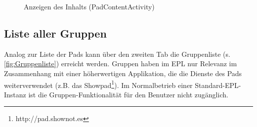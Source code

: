 \begin{figure}[h!]
    \centering
    \setlength\fboxsep{0pt}
	  \caption{Anzeigen des Inhalts (PadContentActivity)}
	  \label{fig:text}
\end{figure}

\subsection{Liste aller Gruppen}
Analog zur Liste der Pads kann über den zweiten Tab die Gruppenliste (s. \autoref{fig:Gruppenliste}) erreicht werden.
Gruppen haben im EPL nur Relevanz im Zusammenhang mit einer höherwertigen Applikation, die die Dienste des Pads weiterverwendet (z.B. das Showpad\footnote{http://pad.shownot.es}).
Im Normalbetrieb einer Standard-EPL-Instanz ist die Gruppen-Funktionalität für den Benutzer nicht zugänglich.

